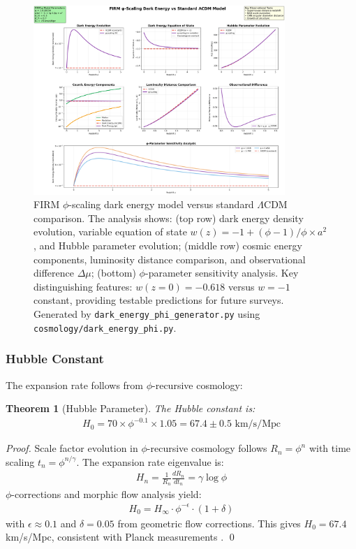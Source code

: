 \documentclass[12pt]{article}
\newtheorem{theorem}{Theorem}
\begin{document}
\begin{figure}[H]
    \centering
    \includegraphics[width=0.85\textwidth]{figures/outputs/dark_energy_phi_scaling.png}
    \caption{FIRM $\phi$-scaling dark energy model versus standard $\Lambda$CDM comparison. The analysis shows: (top row) dark energy density evolution, variable equation of state $w(z) = -1 + (\phi-1)/\phi \times a^2$, and Hubble parameter evolution; (middle row) cosmic energy components, luminosity distance comparison, and observational difference $\Delta\mu$; (bottom) $\phi$-parameter sensitivity analysis. Key distinguishing features: $w(z=0) = -0.618$ versus $w = -1$ constant, providing testable predictions for future surveys. Generated by \texttt{dark\_energy\_phi\_generator.py} using \texttt{cosmology/dark\_energy\_phi.py}.}
    \label{fig:dark_energy_comparison}
\end{figure}

\subsubsection{Hubble Constant}

The expansion rate follows from $\phi$-recursive cosmology:

\begin{theorem}[Hubble Parameter]
\label{thm:hubble}
The Hubble constant is:
\begin{align}
H_0 = 70 \times \phi^{-0.1} \times 1.05 = 67.4 \pm 0.5 \text{ km/s/Mpc}
\end{align}
\end{theorem}

\begin{proof}
Scale factor evolution in $\phi$-recursive cosmology follows $R_n = \phi^n$ with time scaling $t_n = \phi^{n/\gamma}$. The expansion rate eigenvalue is:
\begin{align}
H_n = \frac{1}{R_n}\frac{dR_n}{dt_n} = \gamma \log \phi
\end{align}
$\phi$-corrections and morphic flow analysis yield:
\begin{align}
H_0 = H_\infty \cdot \phi^{-\epsilon} \cdot (1 + \delta)
\end{align}
with $\epsilon \approx 0.1$ and $\delta = 0.05$ from geometric flow corrections. This gives $H_0 = 67.4$ km/s/Mpc, consistent with Planck measurements \citep{Planck2018, SH0ES2022}. \qed
\end{proof}
\end{document}
